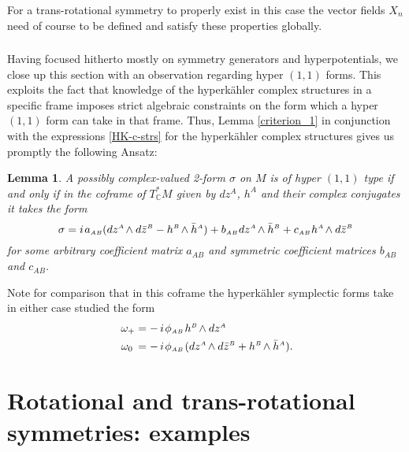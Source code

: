 \documentclass[11pt]{amsart}
\newtheorem{lemma}[theorem]{Lemma}
\theoremstyle{remark}
\theoremstyle{remark}
\theoremstyle{definition}
\theoremstyle{definition}
\theoremstyle{definition}
\newcommand{\0}{{\scriptstyle 0'}} %
\newcommand{\1}{{\scriptstyle 1'}}
\newcommand{\A}{{\scriptscriptstyle A}} %
\newcommand{\B}{{\scriptscriptstyle B}}
\newcommand{\pt}{\hspace{1pt}} %
\newcommand{\hp}{\hspace{0.5pt}} %
\newcommand{\npt}{\hspace{-1pt}} %
\begin{document}
\noindent For a trans-rotational symmetry to properly exist in this case the vector fields $X_n$ need of course to be defined and satisfy these properties globally.


\subsubsection{}

Having focused hitherto mostly on symmetry generators and hyperpotentials, we close up this section with an observation regarding hyper $(1,1)$ forms. This exploits the fact that knowledge of the hyperk\"ahler complex structures in a specific frame imposes strict algebraic constraints on the form which a hyper $(1,1)$ form can take in that frame. Thus, Lemma \ref{criterion_1} in conjunction with the expressions \eqref{HK-c-strs} for the hyperk\"ahler complex structures gives us promptly the following Ansatz:

\begin{lemma}
A possibly complex-valued 2-form $\sigma$ on $M$ is of hyper $(1,1)$ type if and only if in the coframe of $T_{\mathbb{C}}^*M$ given by $dz^{\A}$, $h^{\A}$ and their complex conjugates it takes the form
\begin{equation} \label{hyp-(1,1)}
\sigma = i \pt a_{\A\B} (dz^{\A} \npt \wedge d\bar{z}^{\B} - h^{\B} \npt \wedge \bar{h}^{\A}) + b_{\A\B} \hp dz^{\A} \npt \wedge \bar{h}^{\B} + c_{\A\B} \hp h^{\A} \npt \wedge d\bar{z}^{\B} 
\end{equation}
for some arbitrary coefficient matrix $a_{\A\B}$ and symmetric coefficient matrices $b_{\A\B}$ and $c_{\A\B}$.
\end{lemma}

\noindent Note for comparison that in this coframe the hyperk\"ahler symplectic forms take in either case studied the form
\begin{equation} \label{HK-quat-fr}
\begin{aligned}
\omega_+ & =  - \, i \pt \phi_{\A\B} \pt h^{\B} \npt \wedge dz^{\A} \\
\omega_0 \hspace{1.9pt} & =  - \, i \pt \phi_{\A\B} \pt (dz^{\A} \npt \wedge d\bar{z}^{\B} + h^{\B} \npt \wedge \bar{h}^{\A}) \rlap{.}
\end{aligned}
\end{equation}







\section{Rotational and trans-rotational symmetries: examples} \label{sec:Trans-rot-Ex}
\end{document}
